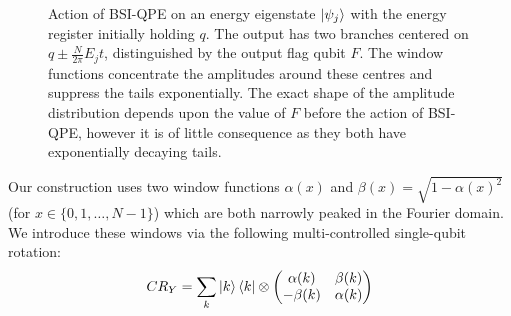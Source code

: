\begin{figure}
\begin{tikzpicture}
 
\end{tikzpicture}
\caption{Action of BSI-QPE on an energy eigenstate $\ket{\psi_j}$ with the energy register initially holding $q$. The output has two branches centered on $q\pm\frac{N}{2\pi}E_jt$, distinguished by the output flag qubit $F$. The window functions concentrate the amplitudes around these centres and suppress the tails exponentially. The exact shape of the amplitude distribution depends upon the value of $F$ before the action of BSI-QPE, however it is of little consequence as they both have exponentially decaying tails.}
\label{fig:Gshift}
\end{figure}

Our construction uses two window functions $\alpha(x)$ and $\beta(x) = \sqrt{1-\alpha(x)^2}$ (for $x\in\{0,1,\ldots,N-1\}$) which are both narrowly peaked in the Fourier domain. We introduce these windows via the following multi-controlled single-qubit rotation:
\begin{equation}
   CR_Y = \sum_k \ket{k}\bra{k}\otimes \begin{pmatrix}
        \alpha(k)& \beta(k)\\
        -\beta(k)& \alpha(k)
    \end{pmatrix}
\end{equation}

